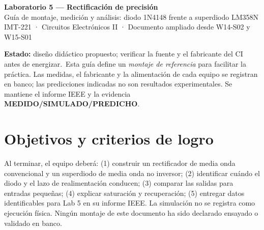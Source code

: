 \documentclass[10pt,a4paper]{article}
\newcommand{\status}{\textbf{Estado:} diseño didáctico propuesto; verificar la fuente y el fabricante del CI antes de energizar.}
\begin{document}
\begin{center}
{\Large\bfseries\textcolor{ucbblue}{Laboratorio 5 — Rectificación de precisión}}\\[2mm]
{\large Guía de montaje, medición y análisis: diodo 1N4148 frente a superdiodo LM358N}\\
\small IMT-221 · Circuitos Electrónicos II · Documento ampliado desde W14-S02 y W15-S01
\end{center}
\begin{note}\status\ Esta guía define un \emph{montaje de referencia} para facilitar la práctica. Las medidas, el fabricante y la alimentación de cada equipo se registran en banco; las predicciones indicadas no son resultados experimentales. Se mantiene el informe IEEE y la evidencia \textbf{MEDIDO/SIMULADO/PREDICHO}.\end{note}
\section{Objetivos y criterios de logro}
Al terminar, el equipo deberá: (1) construir un rectificador de media onda convencional y un superdiodo de media onda no inversor; (2) identificar cuándo el diodo y el lazo de realimentación conducen; (3) comparar las salidas para entradas pequeñas; (4) explicar saturación y recuperación; (5) entregar datos identificables para Lab 5 en su informe IEEE. La simulación no se registra como ejecución física. Ningún montaje de este documento ha sido declarado ensayado o validado en banco.
\end{document}

